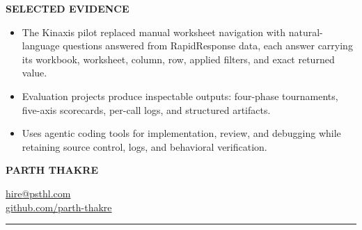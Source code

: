 \documentclass[a4paper,10pt]{article}
\newcommand{\sectionbar}[1]{%
  \vspace{7pt}
  \begin{tcolorbox}[
    enhanced,
    colback=resumeInk,
    colframe=resumeInk,
    boxrule=0pt,
    arc=0pt,
    left=7pt,
    right=7pt,
    top=4pt,
    bottom=4pt,
    width=\linewidth,
  ]
    {\color{white}\bfseries\fontsize{9.5}{11}\selectfont #1}
  \end{tcolorbox}
  \vspace{3pt}
}
\begin{document}
\sectionbar{SELECTED EVIDENCE}
\begin{itemize}
  \item The Kinaxis pilot replaced manual worksheet navigation with natural-language questions answered from RapidResponse data, each answer carrying its workbook, worksheet, column, row, applied filters, and exact returned value.
  \item Evaluation projects produce inspectable outputs: four-phase tournaments, five-axis scorecards, per-call logs, and structured artifacts.
  \item Uses agentic coding tools for implementation, review, and debugging while retaining source control, logs, and behavioral verification.
\end{itemize}

\newpage

\noindent
\begin{minipage}[t]{0.58\linewidth}
  \vspace{0pt}
  {\fontsize{20}{22}\selectfont\bfseries PARTH THAKRE}
\end{minipage}
\hfill
\begin{minipage}[t]{0.38\linewidth}
  \vspace{0pt}
  \raggedleft
  {\footnotesize \href{mailto:hire@psthl.com}{hire@psthl.com}}\\
  {\footnotesize \href{https://github.com/parth-thakre}{github.com/parth-thakre}}
\end{minipage}
\textcolor{resumeRule}{\rule{\linewidth}{1.2pt}}
\end{document}
